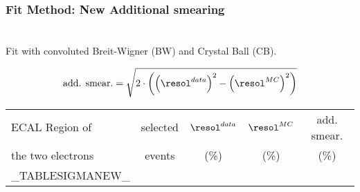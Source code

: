 \color{titlecolor}
\begin{frame}
  \frametitle{Fit Method: New Additional smearing}
  \framesubtitle{\invMassVarName}
 \\
  Fit with convoluted Breit-Wigner (BW) and Crystal Ball (CB).

  $$ \text{add. smear.}  = \sqrt{2 \cdot \left( \left(\resol^{data}\right)^2 - \left(\resol^{MC}\right)^2 \right)}$$

  
  \begin{center}
    \emph{\dataSample}\xspace \invMassVarName

    \begin{tabular}{|l|c|c|c|c|} \hline
      ECAL Region of & selected  & $\resol^{data}$ & $\resol^{MC}$  & add. smear. \\
      the two electrons & events & (\%) & (\%) & (\%) \\
      \hline
      \hline
      _TABLESIGMANEW_
      \hline		
    \end{tabular}
  \end{center}
\end{frame}


